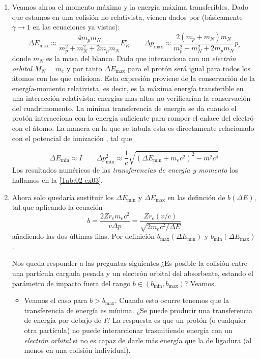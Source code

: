 \begin{enumerate}[label=\alph*)]
    \item  Veamos ahroa el momento máximo y la energía máxima transferibles. Dado que estamos en una colisión no relativista, vienen dados por (básicamente $\gamma \to 1$ en las ecuaciones ya vistas): 
    \begin{equation*}
            \Delta E_{\max} \approx \frac{4m_p m_N}{m_p^2 + m_N^2 + 2m_p m_N} E_K^i \qquad 
            \Delta p_{\max} \approx \frac{2(m_p+m_N)m_N}{m_p^2 + m_N^2 + 2m_p m_N} p_i
    \end{equation*}
    donde $m_N$ es la masa del blanco. Dado que interacciona con un \textit{electrón orbital} $M_N=m_e$ y por tanto $\Delta E_{\max}$ para el protón será igual para todos los átomos con los que colisiona. Esta expresión proviene de la conservación de la energía-momento relativista, es decir, es la máxima energía transferible en una interacción relativista: energías mas altas no verificarían la conservación del cuadrimomento. La mínima transferencia de energía se da cuando el protón interacciona con la energía suficiente para romper el enlace del electró con el átomo. La manera en la que se tabula esta es directamente relacionado con el potencial de ionización \cite{Brau2014}, tal que 

    \begin{equation*}
        \Delta E_{\min} \approx I \qquad \Delta p_{\min}^2 \approx \frac{1}{c} \sqrt{(\Delta E_{\min}+m_ec^2)^2-m^2 c^4}
    \end{equation*}
    Los resultados numéricos de las \textit{transferencias de energía y momento} los hallamos en la \cref{Tab:02-ex03}.
    
    \item Ahora solo quedaría sustituir los $\Delta E_{\min}$ y $\Delta E_{\max}$ en las definción de $b(\Delta E)$, tal que aplicando la ecuación 
     \[
        b = \frac{2 Z r_e m_e c^2}{v \Delta p} = \frac{Z r_e (v/c)}{\sqrt{2 m_e c^2 / \Delta E}}
    \]
    añadiendo las dos últimas filas. Por definición $b_{\max} (\Delta E_{\min})$ y $b_{\min} (\Delta E_{\max})$.  
    
    Nos queda responder a las preguntas siguientes.¿Es posible la colisión entre una partícula cargada pesada y un electrón orbital del absorbente, estando el parámetro de impacto fuera del rango $b \in (b_{\min}, b_{\max})$? Veamos. 
    \begin{itemize}
        \item Veamos el caso para $b>b_{\max}$. Cuando esto ocurre tenemos que la transferencia de energía es mínima. ¿Se puede producir una transferencia de energía por debajo de $I$? La respuesta es que un protón (o cualquier otra partícula) no puede interaccionar trasmitiendo energía con un \textit{electrón orbital} si no es capaz de darle más energía que la de ligadura (al menos en una colisión individual). 
        

\end{itemize}
\end{enumerate}
